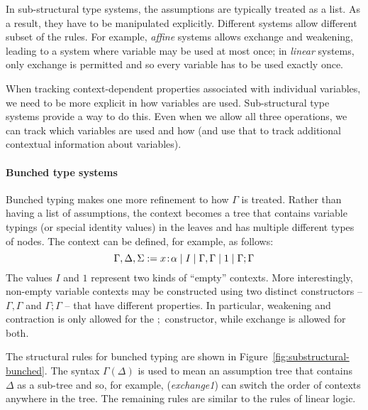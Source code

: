 In sub-structural type systems, the assumptions are typically treated as a list. As a result,
they have to be manipulated explicitly. Different systems allow different subset of the rules.
For example, \emph{affine} systems allows exchange and weakening, leading to a system where 
variable may be used at most once; in \emph{linear} systems, only exchange is permitted and so 
every variable has to be used exactly once.

When tracking context-dependent properties associated with individual variables, we need to 
be more explicit in how variables are used. Sub-structural type systems provide a way to do this.
Even when we allow all three operations, we can track which variables are used and how
(and use that to track additional contextual information about variables). 


\paragraph{Bunched type systems}
Bunched typing makes one more refinement to how $\Gamma$ is treated. Rather than having a list
of assumptions, the context becomes a tree that contains variable typings (or special identity
values) in the leaves and has multiple different types of nodes. The context can be defined,
for example, as follows:
%
\begin{equation*}
\Gamma, \Delta, \Sigma := x\!:\!\alpha \; | \; I \; | \; \Gamma, \Gamma \; | \; 1 \; | \; \Gamma; \Gamma
\end{equation*}
%
The values $I$ and $1$ represent two kinds of ``empty'' contexts. More interestingly, non-empty
variable contexts may be constructed using two distinct constructors -- $\Gamma, \Gamma$ and 
$\Gamma; \Gamma$ -- that have different properties. In particular, weakening and contraction is
only allowed for the $;$ constructor, while exchange is allowed for both.  

The structural rules for bunched typing are shown in Figure~\ref{fig:substructural-bunched}.
The syntax $\Gamma(\Delta)$ is used to mean an assumption tree that contains $\Delta$ as a 
sub-tree and so, for example, (\emph{exchange1}) can switch the order of contexts anywhere in the
tree. The remaining rules are similar to the rules of linear logic.


